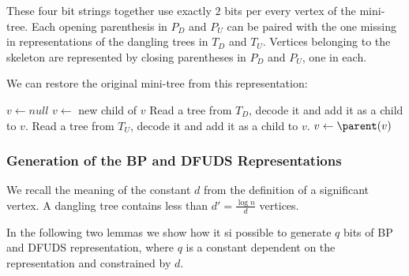 These four bit strings together use exactly $2$ bits per every vertex of the mini-tree.
Each opening parenthesis in $P_D$ and $P_U$ can be paired with the one missing in representations of the dangling trees in $T_D$ and $T_U$.
Vertices belonging to the skeleton are represented by closing parentheses in $P_D$ and $P_U$, one in each.

We can restore the original mini-tree from this representation:
\begin{algorithm}
\begin{algorithmic}
\Function{\restore}{}
	\State $v \gets null$
		\State $v \gets$ new child of $v$
			\State Read a tree from $T_D$, decode it and add it as a child to $v$.
		\EndWhile
	\EndWhile
			\State Read a tree from $T_U$, decode it and add it as a child to $v$.
		\EndWhile
		\State $v \gets \parent(v)$
	\EndWhile
\EndFunction
\end{algorithmic}
\end{algorithm}

\subsubsection{Generation of the BP and DFUDS Representations}

We recall the meaning of the constant $d$ from the definition of a significant vertex.
A dangling tree contains less than $d' = \frac{\log n}{d}$ vertices.

In the following two lemmas we show how it si possible to generate $q$ bits of BP and DFUDS representation, where $q$ is a constant dependent on the representation and constrained by $d$.

